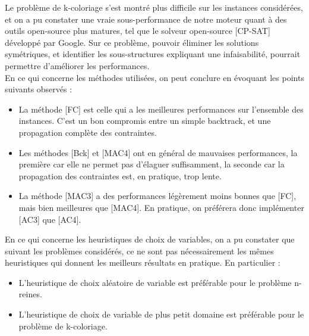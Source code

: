 \documentclass[14pt]{article}
\begin{document}
Le problème de k-coloriage s'est montré plus difficile sur les instances considérées, et on a pu constater une vraie sous-performance de notre moteur quant à des outils open-source plus matures, tel que le solveur open-source [CP-SAT] développé par Google. Sur ce problème, pouvoir éliminer les solutions symétriques, et identifier les sous-structures expliquant une infaisabilité, pourrait permettre d'améliorer les performances.\\

En ce qui concerne les méthodes utilisées, on peut conclure en évoquant les points suivants observés :

\begin{itemize}
	\item La méthode [FC] est celle qui a les meilleures performances sur l'ensemble des instances. C'est un bon compromis entre un simple backtrack, et une propagation complète des contraintes.
	\item Les méthodes [Bck] et [MAC4] ont en général de mauvaises performances, la première car elle ne permet pas d'élaguer suffisamment, la seconde car la propagation des contraintes est, en pratique, trop lente.
	\item La méthode [MAC3] a des performances légèrement moins bonnes que [FC], mais bien meilleures que [MAC4]. En pratique, on préférera donc implémenter [AC3] que [AC4].\\
\end{itemize}


En ce qui concerne les heuristiques de choix de variables, on a pu constater que suivant les problèmes considérés, ce ne sont pas nécessairement les mêmes heuristiques qui donnent les meilleurs résultats en pratique. En particulier : 

\begin{itemize}
	\item L'heuristique de choix aléatoire de variable est préférable pour le problème n-reines.
	\item L'heuristique de choix de variable de plus petit domaine est préférable pour le problème de k-coloriage.
\end{itemize}
\end{document}
